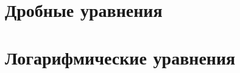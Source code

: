 \documentclass[10pt, a4paper]{article}
\begin{document}
\section{Дробные уравнения}
\section{Логарифмические уравнения}
\end{document}
